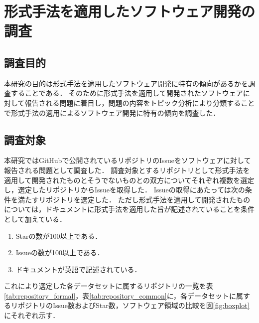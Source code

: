 \documentclass[main]{subfiles}
\begin{document}
\chapter{形式手法を適用したソフトウェア開発の調査}

\section{調査目的}

本研究の目的は形式手法を適用したソフトウェア開発に特有の傾向があるかを調査することである．
そのために形式手法を適用して開発されたソフトウェアに対して報告される問題に着目し，問題の内容をトピック分析により分類することで形式手法の適用によるソフトウェア開発に特有の傾向を調査した．

\section{調査対象}
\label{sec:survey-target}

本研究ではGitHubで公開されているリポジトリのIssueをソフトウェアに対して報告される問題として調査した．
調査対象とするリポジトリとして形式手法を適用して開発されたものとそうでないものとの双方についてそれぞれ複数を選定し，選定したリポジトリからIssueを取得した．
Issueの取得にあたっては次の条件を満たすリポジトリを選定した．
ただし形式手法を適用して開発されたものについては，ドキュメントに形式手法を適用した旨が記述されていることを条件として加えている．

\begin{enumerate}
	\item Starの数が100以上である．
	\item Issueの数が100以上である．
	\item ドキュメントが英語で記述されている．
\end{enumerate}

これにより選定した各データセットに属するリポジトリの一覧を表\ref{tab:repository_formal}，表\ref{tab:repository_common}に，各データセットに属するリポジトリのIssue数およびStar数，ソフトウェア領域の比較を図\ref{fig:boxplot}にそれぞれ示す．


\end{document}
